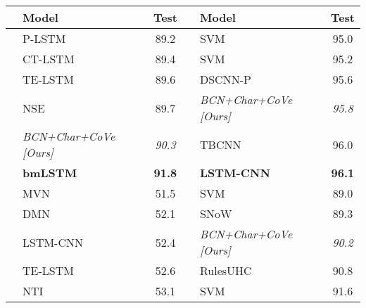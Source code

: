 \begin{table}
  \centering
  \setlength\tabcolsep{3.65pt}
\begin{tabular}{llcllc}
    \toprule
 & Model & Test &  & Model & Test\\
\midrule
 \parbox[t]{2mm}{} & P-LSTM~\citep{Wieting2015TowardsUP} & 89.2             & \parbox[t]{2mm}{} & SVM~\citep{Silva2011FromST} & 95.0           \\
                        & CT-LSTM~\citep{Looks2017DeepLW} & 89.4             &                         & SVM~\citep{Vantu2016QC}  & 95.2              \\
                        & TE-LSTM~\citep{Huang2017EncodingSK} & 89.6             &                         & DSCNN-P~\citep{Zhang2016DependencySC} & 95.6             \\
                        & NSE~\citep{Munkhdalai2016NeuralSE} & 89.7             &                         & {\it BCN+Char+CoVe [Ours] }& {\it95.8 }          \\
                        & {\it BCN+Char+CoVe [Ours]           }          & {\it90.3}          &                         &  TBCNN~\citep{Mou2015DiscriminativeNS}& 96.0             \\
                        & \textbf{bmLSTM~\citep{Radford2017LearningTG}} & \textbf{91.8}             &                         & \textbf{LSTM-CNN~\citep{Zhou2016TextCI}}            & \textbf{96.1} \\
\midrule
 \parbox[t]{2mm}{} & MVN~\citep{Guo2017EndtoEndMN} & 51.5          & \parbox[t]{2mm}{}& SVM~\citep{Loni2011QuestionCB}&89.0           \\
                        & DMN~\citep{Kumar2016} & 52.1             &                         & SNoW~\citep{Li2006LearningQC} & 89.3             \\
                        & LSTM-CNN~\citep{Zhou2016TextCI} & 52.4             &                         & {\it BCN+Char+CoVe [Ours]        }           & {\it90.2}             \\
                        & TE-LSTM~\citep{Huang2017EncodingSK} & 52.6             &                         & RulesUHC~\citep{Silva2011FromST}       & 90.8             \\
                        & NTI~\citep{Munkhdalai2016NeuralTI} & 53.1             &                         &  SVM~\citep{Vantu2016QC}                    &     91.6      \\

\end{tabular}
\end{table}

